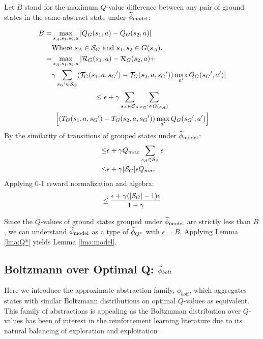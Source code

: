 Let $B$ stand for the maximum $Q$-value difference between any pair of ground states in the same abstract state under $\widetilde \phi_{\text{model}}$:

\begin{align*}
B = &\max_{s_A, s_1, s_2, a}  |Q_G(s_1, a) - Q_G(s_2, a)|\\
&\text{Where $s_A \in \mathcal{S}_G$ and $s_1, s_2 \in G(s_A)$.}\\
=&\max_{s_A, s_1, s_2, a}      |\mathcal{R}_G(s_1, a) - \mathcal{R}_G(s_2, a) +\\
& \gamma \sum_{{s_G}' \in \mathcal{S}_G}(\mathcal{T}_G(s_1,a,{s_G}')-\mathcal{T}_G(s_2, a, {s_G}'))\max_{a'}Q_G({s_G}', a')|
\end{align*}
\begin{multline*}
\leq \epsilon + \gamma \sum_{s_A \in \mathcal{S}_A}\sum_{{s_G}' \in G(s_A)} \\ \left[(T_G(s_1, a, {s_G}')-T_G(s_2, a, {s_G}')) 	\max_{a'}Q_G({s_G}', a')	\right]
\end{multline*}
By the similarity of transitions of grouped states under $\widetilde \phi_{\text{model}}$:
\begin{align*}
 \leq &\epsilon + \gamma Q_{max} \sum_{s_A \in \mathcal{S}_A} \epsilon \\
\leq& \epsilon + \gamma|\mathcal{S}_G|\epsilon Q_{max}
\end{align*}
Applying 0-1 reward normalization and algebra:
\begin{equation*}
 \leq \frac{\epsilon + \gamma(|\mathcal{S}_G| - 1) \epsilon}{1-\gamma}
\end{equation*}


Since the $Q$-values of ground states grouped under $\widetilde \phi_{\text{model}}$ are strictly less than $B$, we can understand $\widetilde \phi_{\text{model}}$ as a type of $\widetilde \phi_{Q^*}$ with $\epsilon = B$. Applying Lemma \ref{lma:Q*} yields Lemma \ref{lma:model}.


\subsection{Boltzmann over Optimal Q: $\widetilde \phi_{bolt}$}
\label{sec:boltz}

Here we introduce the approximate abstraction family, $\phi_{bolt}$, which aggregates states with similar Boltzmann distributions on optimal $Q$-values as equivalent. This family of abstractions is appealing as the Boltzmman distribution over $Q$-values has been of interest in the reinforcement learning literature due to its natural balancing of exploration and exploitation~\cite{sutton1998reinforcement}.

